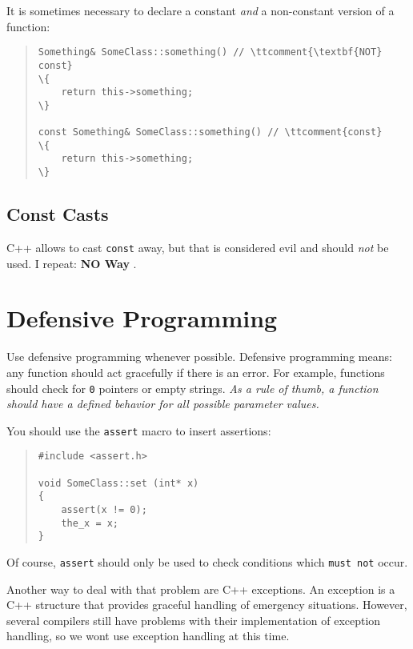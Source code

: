 \noindent It is sometimes necessary to declare a constant \emph{and} a 
non-constant version of a function:

\begin{quote}
\begin{verbatim}
Something& SomeClass::something() // \ttcomment{\textbf{NOT} const}
\{
    return this->something;
\}

const Something& SomeClass::something() // \ttcomment{const}
\{
    return this->something;
\}
\end{verbatim}
\end{quote}


%
%

\subsection{Const Casts}

C++ allows to cast \texttt{const} away, but that is considered evil 
and should \emph{not} be used. I repeat: \textbf{NO Way }.


%
%


\section{Defensive Programming}

Use defensive programming whenever possible.  Defensive
programming means: any function should act gracefully if there is
an error.  For example, functions should check for \texttt{0}
pointers or empty strings.  \emph{As a rule of thumb, a function
  should have a defined behavior for all possible parameter
  values.}

You should use the \texttt{assert} macro to insert assertions:

\begin{quote}
\begin{verbatim}
#include <assert.h>

void SomeClass::set (int* x)
{
    assert(x != 0);            
    the_x = x;
}
\end{verbatim}
\end{quote}

\noindent Of course, \texttt{assert} should only be used to check
conditions which \texttt{must not} occur.

Another way to deal with that problem are C++ exceptions.  An
exception is a C++ structure that provides graceful handling of
emergency situations.  However, several compilers still have
problems with their implementation of exception handling, so we
wont use exception handling at this time.

